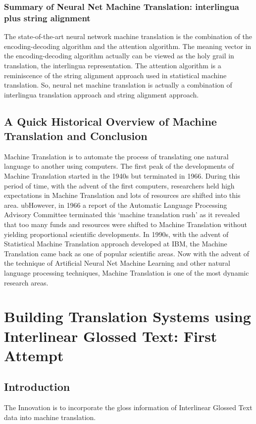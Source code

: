 \documentclass[final]{ua-thesis}
\numberwithin{equation}{section}
\begin{document}
\subsection{Summary of Neural Net Machine Translation: interlingua plus string alignment}

The state-of-the-art neural network machine translation is the combination of the encoding-decoding algorithm and the attention algorithm. The meaning vector in the encoding-decoding algorithm actually can be viewed as the holy grail in translation, the interlingua representation. The attention algorithm is a reminiscence of the string alignment approach used in statistical machine translation. So, neural net machine translation is actually a combination of interlingua  translation approach and string alignment approach.   


\section{A Quick Historical Overview of Machine Translation and Conclusion}

Machine Translation is to automate the process of translating one natural language to another using computers. The first peak of the developments of Machine Translation started in the 1940s but terminated in 1966. During this period of time, with the advent of the first computers, researchers held high expectations in Machine Translation and lots of resources are shifted into this area. 
ubHowever, in 1966 a report of the Automatic Language Processing Advisory Committee \citep{pierce1966language} terminated this `machine translation rush' as it revealed that too many funds and resources were shifted to Machine Translation without yielding proportional scientific developments. In 1990s, with the advent of Statistical Machine Translation approach developed at IBM, the Machine Translation came back as one of popular scientific areas. Now with the advent of the technique of Artificial Neural Net Machine Learning and other natural language processing techniques, Machine Translation is one of the most dynamic research areas.    
\chapter{Building Translation Systems using Interlinear Glossed Text: First Attempt}
\label{chap:cake}


\section{Introduction}
The Innovation is to incorporate the gloss information of Interlinear Glossed Text data into machine translation.
\end{document}
